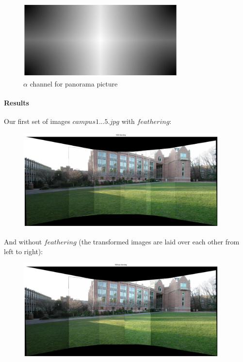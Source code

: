 \documentclass[subfigure,epsfig,fleqn,float,numbers=noenddot]{scrartcl}
\begin{document}
	\begin{figure}[H]
		\centering
		\includegraphics[width=0.75\textwidth]{./img/interpolationFactor.jpg}
		\caption{$\alpha$ channel for panorama picture}
		\label{img:interpolation}
	\end{figure}
	
\paragraph{Results}
Our first set of images $campus1...5.jpg$ with $feathering$:
\begin{figure}[H]
		\centering
		\includegraphics[width=0.95\textwidth]{./img/withBlending.jpg}
		\caption{}
		\label{img:withBlend}
\end{figure}
And without $feathering$ (the transformed images are laid over each other from left to right):
\begin{figure}[H]
		\centering
		\includegraphics[width=0.95\textwidth]{./img/withoutBlending.jpg}
		\caption{}
		\label{img:withoutBlend}
\end{figure} 
\end{document}
